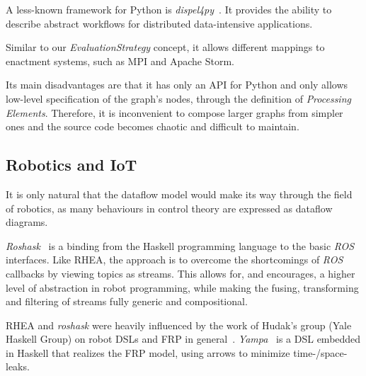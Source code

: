\documentclass[sigplan,review,anonymous]{acmart}
\begin{document}
A less-known framework for Python is
\textit{dispel4py}~\cite{dispel4py}. It provides the ability
to describe abstract workflows for distributed data-intensive applications.

Similar to our \textit{EvaluationStrategy} concept, it allows different mappings
to enactment systems, such as MPI and Apache Storm.

Its main disadvantages are that it has only an API for Python and only allows
low-level specification of the graph's nodes, through the definition of
\textit{Processing Elements}. Therefore, it is inconvenient to compose larger
graphs from simpler ones and the source code becomes chaotic and difficult to
maintain.

\subsection{Robotics and IoT}

It is only natural that the dataflow model would make its way through the field
of robotics, as many behaviours in control theory are expressed as dataflow
diagrams.

\textit{Roshask}~\cite{roshask} is a binding from the Haskell programming language
to the basic \textit{ROS} interfaces. Like \textsc{RHEA}, the approach is to
overcome the shortcomings of \textit{ROS} callbacks by viewing topics as
streams. This allows for, and encourages, a higher level of abstraction in
robot programming, while making the fusing, transforming and filtering of
streams fully generic and compositional.

\textsc{RHEA} and \textit{roshask} were heavily influenced by the work of Hudak's
group (Yale Haskell Group) on robot DSLs and FRP in general~\cite{fran,arrows_robots,lambda_in_motion}.
\textit{Yampa}~\cite{yampa} is a DSL embedded in Haskell
that realizes the FRP model, using arrows to minimize time-/space- leaks.

\end{document}
